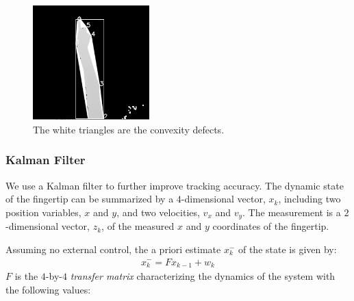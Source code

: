 \begin{figure}[h]
  \centering
  \includegraphics[width=0.4\textwidth]{figures/convexity_defects2.png} 
  \caption{The white triangles are the convexity defects.}
  \label{fig:convexity_defects}
\end{figure}

\subsubsection{Kalman Filter}
We use a Kalman filter to further improve tracking accuracy. The dynamic state
of the fingertip can be summarized by a $4$-dimensional vector, $x_k$, including
two position variables, $x$ and $y$, and two velocities, $v_x$ and $v_y$. The
measurement is a $2$-dimensional vector, $z_k$, of the measured $x$ and $y$ coordinates of the fingertip.

Assuming no external control, the a priori estimate $x_k^-$ of the state is
given by:
\begin{align*}
x_k^- = Fx_{k - 1} + w_k
\end{align*}
$F$ is the $4$-by-$4$ \textit{transfer matrix} characterizing the
dynamics of the system with the following values:

